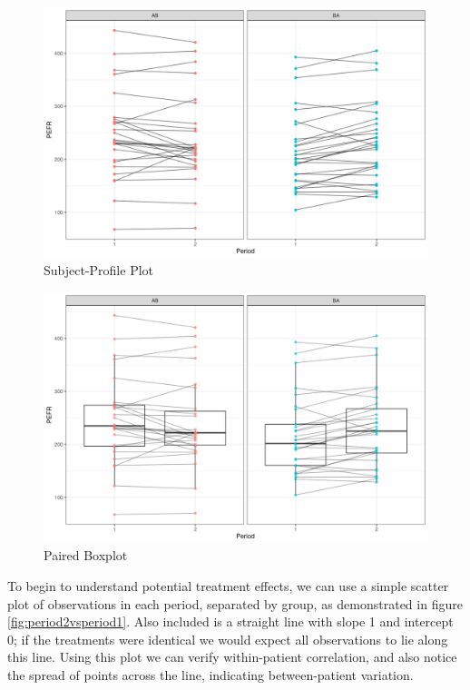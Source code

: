 \documentclass[12pt, TexShade, letterpaper]{report}
\begin{document}
\begin{figure}[H]
    \centering
    \includegraphics[height=0.42\textheight, keepaspectratio]{report/figures/ch2/subjectProfilesPlot.png}
    \caption{Subject-Profile Plot}
    \label{fig:subjectprofile}
\end{figure}
\begin{figure}[H]
    \centering
    \includegraphics[height=0.42\textheight]{report/figures/ch2/pairedBoxplot.png}
    \caption{Paired Boxplot}
    \label{fig:pairedboxplot}
\end{figure}

To begin to understand potential treatment effects, we can use a simple scatter plot of observations in each period, separated by group, as demonstrated in figure \ref{fig:period2vsperiod1}. Also included is a straight line with slope 1 and intercept 0; if the treatments were identical we would expect all observations to lie along this line. Using this plot we can verify within-patient correlation, and also notice the spread of points across the line, indicating between-patient variation.
\end{document}
